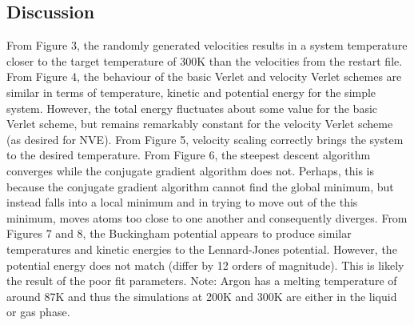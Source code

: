 \documentclass{article}
\begin{document}
\subsection*{Discussion}

From Figure 3, the randomly generated velocities results in a system temperature closer to the target temperature of 300K than the velocities from the restart file.
From Figure 4, the behaviour of the basic Verlet and velocity Verlet schemes are similar in terms of temperature, kinetic and potential energy for the simple system. However, the total energy fluctuates about some value for the basic Verlet scheme, but remains remarkably constant for the velocity Verlet scheme (as desired for NVE).
From Figure 5, velocity scaling correctly brings the system to the desired temperature.
From Figure 6, the steepest descent algorithm converges while the conjugate gradient algorithm does not. Perhaps, this is because the conjugate gradient algorithm cannot find the global minimum, but instead falls into a local minimum and in trying to move out of the this minimum, moves atoms too close to one another and consequently diverges.
From Figures 7 and 8, the Buckingham potential appears to produce similar temperatures and kinetic energies to the Lennard-Jones potential. However, the potential energy does not match (differ by 12 orders of magnitude). This is likely the result of the poor fit parameters.
Note: Argon has a melting temperature of around 87K and thus the simulations at 200K and 300K are either in the liquid or gas phase.


\end{document}
